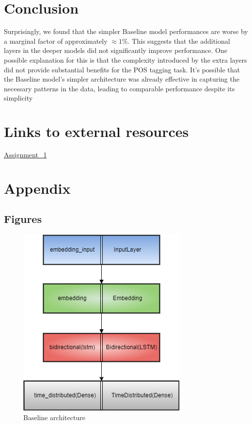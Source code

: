 \documentclass[11pt]{article}
\begin{document}
\section{Conclusion}
\label{sec:conclusion}
Surprisingly, we found that the simpler Baseline
model performances are worse by a marginal factor of approximately $\approx 1\%$. This suggests that the
additional layers in the deeper models did not significantly improve performance. One possible explanation for this is that the complexity introduced
by the extra layers did not provide substantial benefits for the POS tagging task. It’s possible that the
Baseline model’s simpler architecture was already
effective in capturing the necessary patterns in the
data, leading to comparable performance despite
its simplicity



\section{Links to external resources}
\label{sec:links}
\href{https://github.com/antoniototimorelli/nlp_unibo_2023-24_assignments/tree/main/Assignment_1}{Assignment\_1}

\onecolumn
\section*{Appendix}
\subsection*{Figures}
\begin{figure}[H]
        \centering
        \includegraphics[scale=0.41]{img/Baseline.png}
        \caption{Baseline architecture}
        \label{fig:baseline}
\end{figure}
\end{document}
